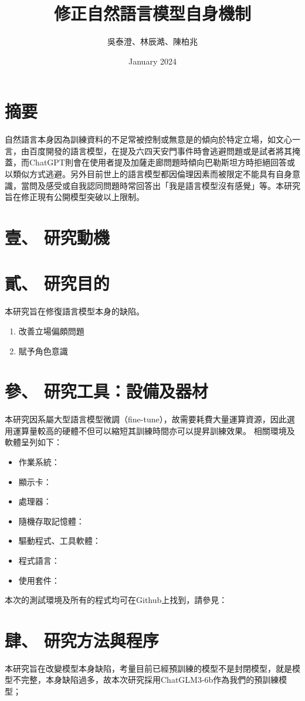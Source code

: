 \documentclass[12pt,a4paper,Times New Roman,UTF8,natbib]{article}
\title{修正自然語言模型自身機制}
\author{吳泰澄、林辰澔、陳柏兆}
\date{January 2024}
\begin{document}
\begin{CJK*}{UTF8}{bsmi}
	
	\maketitle
	\newpage
	\tableofcontents
	\newpage
	\section{摘要}
	自然語言本身因為訓練資料的不足常被控制或無意是的傾向於特定立場，如文心一言，由百度開發的語言模型，在提及六四天安門事件時會逃避問題或是試者將其掩蓋，而ChatGPT則會在使用者提及加薩走廊問題時傾向巴勒斯坦方時拒絕回答或以類似方式逃避。另外目前世上的語言模型都因倫理因素而被限定不能具有自身意識，當問及感受或自我認同問題時常回答出「我是語言模型沒有感覺」等。本研究旨在修正現有公開模型突破以上限制。
	\section{壹、 研究動機}
	\section{貳、 研究目的}
	本研究旨在修復語言模型本身的缺陷。
	\begin{enumerate}
		\item 改善立場偏頗問題
		\item 賦予角色意識
	\end{enumerate}
	\section{參、 研究工具：設備及器材}
	本研究因系屬大型語言模型微調（fine-tune），故需要耗費大量運算資源，因此選用運算量較高的硬體不但可以縮短其訓練時間亦可以提昇訓練效果。
	相關環境及軟體呈列如下：
	\begin{itemize}
		\item 作業系統：
		\item 顯示卡：
		\item 處理器：
		\item 隨機存取記憶體：
		\item 驅動程式、工具軟體：
		\item 程式語言：
		\item 使用套件：
	\end{itemize}	
	本次的測試環境及所有的程式均可在Github上找到，請參見：
	\section{肆、 研究方法與程序}
	本研究旨在改變模型本身缺陷，考量目前已經預訓練的模型不是封閉模型，就是模型不完整，本身缺陷過多，故本次研究採用ChatGLM3-6b作為我們的預訓練模型；

\end{CJK*}
\end{document}
